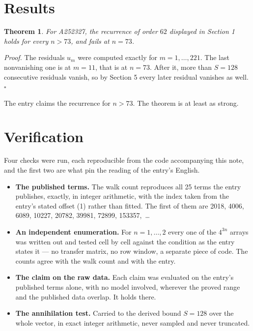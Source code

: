 \documentclass[11pt]{article}
\newtheorem{theorem}{Theorem}
\theoremstyle{definition}
\begin{document}
\section{Results}

\begin{theorem} For A252327, the recurrence of order $62$ displayed in Section 1 holds for every $n > 73$, and fails at $n = 73$.\end{theorem}

{\itshape Proof.} The residuals $u_m$ were computed exactly for $m = 1,\dots,221$. The last nonvanishing one is at $m = 11$, that is at $n = 73$. After it, more than $S = 128$ consecutive residuals vanish, so by Section 5 every later residual vanishes as well. $\square$

The entry claims the recurrence for $n > 73$. The theorem is at least as strong.

\section{Verification}

Four checks were run, each reproducible from the code accompanying this note, and the first two are what pin the reading of the entry's English.

\begin{itemize}

\item {\bfseries The published terms.} The walk count reproduces all 25 terms the entry publishes, exactly, in integer arithmetic, with the index taken from the entry's stated offset (1) rather than fitted. The first of them are 2018, 4006, 6089, 10227, 20782, 39981, 72899, 153357,~\dots

\item {\bfseries An independent enumeration.} For $n = 1,\dots,2$ every one of the $4^{3n}$ arrays was written out and tested cell by cell against the condition as the entry states it --- no transfer matrix, no row window, a separate piece of code. The counts agree with the walk count and with the entry.

\item {\bfseries The claim on the raw data.} Each claim was evaluated on the entry's published terms alone, with no model involved, wherever the proved range and the published data overlap. It holds there.

\item {\bfseries The annihilation test.} Carried to the derived bound $S = 128$ over the whole vector, in exact integer arithmetic, never sampled and never truncated.

\end{itemize}
\end{document}

